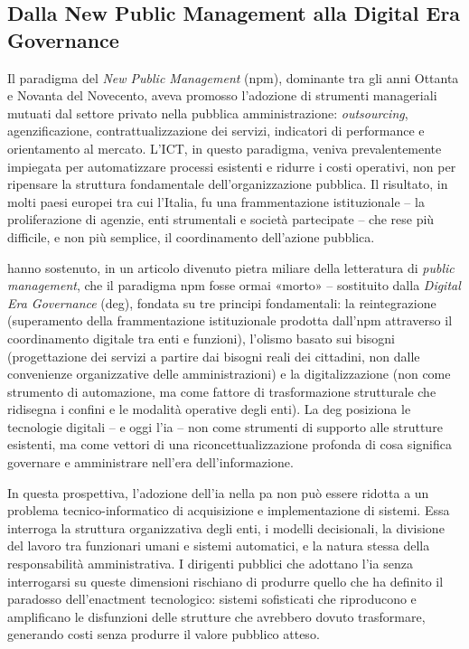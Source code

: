 \subsection{Dalla New Public Management alla Digital Era Governance}

Il paradigma del \textit{New Public Management} (\gls{npm}), dominante tra gli anni Ottanta e Novanta del Novecento, aveva promosso l'adozione di strumenti manageriali mutuati dal settore privato nella pubblica amministrazione: \textit{outsourcing}, agenzificazione, contrattualizzazione dei servizi, indicatori di performance e orientamento al mercato. L'ICT, in questo paradigma, veniva prevalentemente impiegata per automatizzare processi esistenti e ridurre i costi operativi, non per ripensare la struttura fondamentale dell'organizzazione pubblica. Il risultato, in molti paesi europei tra cui l'Italia, fu una frammentazione istituzionale -- la proliferazione di agenzie, enti strumentali e società partecipate -- che rese più difficile, e non più semplice, il coordinamento dell'azione pubblica.

\textcite{Dunleavy2006} hanno sostenuto, in un articolo divenuto pietra miliare della letteratura di \textit{public management}, che il paradigma \gls{npm} fosse ormai «morto» -- sostituito dalla \textit{Digital Era Governance} (\gls{deg}), fondata su tre principi fondamentali: la reintegrazione (superamento della frammentazione istituzionale prodotta dall'\gls{npm} attraverso il coordinamento digitale tra enti e funzioni), l'olismo basato sui bisogni (progettazione dei servizi a partire dai bisogni reali dei cittadini, non dalle convenienze organizzative delle amministrazioni) e la digitalizzazione (non come strumento di automazione, ma come fattore di trasformazione strutturale che ridisegna i confini e le modalità operative degli enti). La \gls{deg} posiziona le tecnologie digitali -- e oggi l'\gls{ia} -- non come strumenti di supporto alle strutture esistenti, ma come vettori di una riconcettualizzazione profonda di cosa significa governare e amministrare nell'era dell'informazione.

In questa prospettiva, l'adozione dell'\gls{ia} nella \gls{pa} non può essere ridotta a un problema tecnico-informatico di acquisizione e implementazione di sistemi. Essa interroga la struttura organizzativa degli enti, i modelli decisionali, la divisione del lavoro tra funzionari umani e sistemi automatici, e la natura stessa della responsabilità amministrativa. I dirigenti pubblici che adottano l'\gls{ia} senza interrogarsi su queste dimensioni rischiano di produrre quello che \textcite{Fountain2001} ha definito il paradosso dell'enactment tecnologico: sistemi sofisticati che riproducono e amplificano le disfunzioni delle strutture che avrebbero dovuto trasformare, generando costi senza produrre il valore pubblico atteso.

